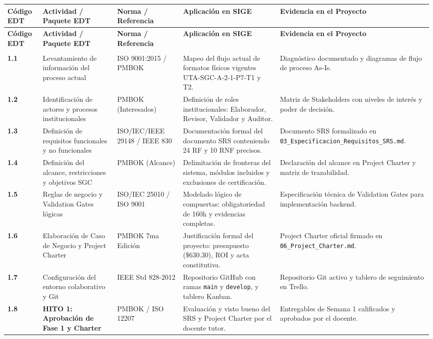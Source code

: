 \documentclass[12pt,a4paper]{article}
\begin{document}
\renewcommand{\arraystretch}{1.15}
\setlength{\tabcolsep}{3pt}
\small
\begin{longtable}{|>{\centering\arraybackslash}m{1.4cm}|>{\raggedright\arraybackslash}m{3.2cm}|>{\raggedright\arraybackslash}m{2.6cm}|>{\raggedright\arraybackslash}m{4.6cm}|>{\raggedright\arraybackslash}m{3.4cm}|}
\hline
\rowcolor{tableheader}
\textbf{Código EDT} & \textbf{Actividad / Paquete EDT} & \textbf{Norma / Referencia} & \textbf{Aplicación en SIGE} & \textbf{Evidencia en el Proyecto} \\
\hline
\endfirsthead
\hline
\rowcolor{tableheader}
\textbf{Código EDT} & \textbf{Actividad / Paquete EDT} & \textbf{Norma / Referencia} & \textbf{Aplicación en SIGE} & \textbf{Evidencia en el Proyecto} \\
\hline
\endhead
\hline
\endfoot
\hline
\endlastfoot

\multicolumn{5}{|l|}{\cellcolor{lightgraybg}\textbf{FASE 1: ANÁLISIS Y PLANIFICACIÓN}} \\ \hline
\textbf{1.1} & Levantamiento de información del proceso actual & ISO 9001:2015 / PMBOK & Mapeo del flujo actual de formatos físicos vigentes UTA-SGC-A-2-1-P7-T1 y T2. & Diagnóstico documentado y diagramas de flujo de proceso As-Is. \\ \hline
\textbf{1.2} & Identificación de actores y procesos institucionales & PMBOK (Interesados) & Definición de roles institucionales: Elaborador, Revisor, Validador y Auditor. & Matriz de Stakeholders con niveles de interés y poder de decisión. \\ \hline
\textbf{1.3} & Definición de requisitos funcionales y no funcionales & ISO/IEC/IEEE 29148 / IEEE 830 & Documentación formal del documento SRS conteniendo 24 RF y 10 RNF precisos. & Documento SRS formalizado en \texttt{03\_Especificacion\_Requisitos\_SRS.md}. \\ \hline
\textbf{1.4} & Definición del alcance, restricciones y objetivos SGC & PMBOK (Alcance) & Delimitación de fronteras del sistema, módulos incluidos y exclusiones de certificación. & Declaración del alcance en Project Charter y matriz de trazabilidad. \\ \hline
\textbf{1.5} & Reglas de negocio y Validation Gates lógicas & ISO/IEC 25010 / ISO 9001 & Modelado lógico de compuertas: obligatoriedad de 160h y evidencias completas. & Especificación técnica de Validation Gates para implementación backend. \\ \hline
\textbf{1.6} & Elaboración de Caso de Negocio y Project Charter & PMBOK 7ma Edición & Justificación formal del proyecto: presupuesto (\$630.30), ROI y acta constitutiva. & Project Charter oficial firmado en \texttt{06\_Project\_Charter.md}. \\ \hline
\textbf{1.7} & Configuración del entorno colaborativo y Git & IEEE Std 828-2012 & Repositorio GitHub con ramas \texttt{main} y \texttt{develop}, y tablero Kanban. & Repositorio Git activo y tablero de seguimiento en Trello. \\ \hline
\textbf{1.8} & \textbf{HITO 1: Aprobación de Fase 1 y Charter} & PMBOK / ISO 12207 & Evaluación y visto bueno del SRS y Project Charter por el docente tutor. & Entregables de Semana 1 calificados y aprobados por el docente. \\ \hline


\end{longtable}
\end{document}
